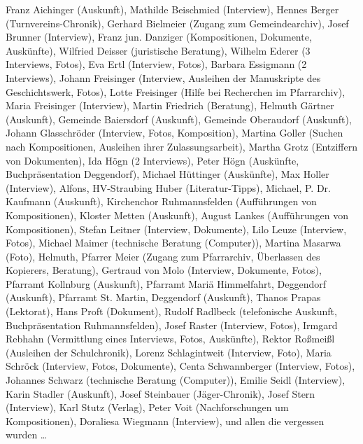 \documentclass{book}
\begin{document}
Franz Aichinger (Auskunft), Mathilde Beischmied (Interview), Hennes
Berger (Turnvereins-Chronik), Gerhard Bielmeier (Zugang zum
Gemeindearchiv), Josef Brunner (Interview), Franz jun. Danziger
(Kompositionen, Dokumente, Auskünfte), Wilfried Deisser (juristische
Beratung), Wilhelm Ederer (3 Inter\-views, Fotos), Eva Ertl (Interview,
Fotos), Barbara Essigmann (2 Interviews), Johann Freisinger (Interview,
Ausleihen der Manuskripte des Geschichtswerk, Fotos), Lotte Freisinger
(Hilfe bei Recherchen im Pfarrarchiv), Maria Frei\-singer (Interview),
Martin Friedrich (Beratung), Helmuth Gärtner (Auskunft), Gemeinde
Baiersdorf (Auskunft), Gemeinde Oberaudorf (Auskunft), Johann
Glasschröder (Interview, Fotos, Komposition), Martina Goller (Suchen
nach Kompositionen, Ausleihen ihrer Zulassungsarbeit), Martha Grotz
(Entziffern von Dokumenten), Ida Högn (2 Interviews), Peter Högn
(Auskünfte, Buchpräsentation Deggendorf), Michael Hüttinger
(Auskünfte), Max Holler (Interview), Alfons, HV-Straubing Huber
(Literatur-Tipps), Michael, P. Dr. Kaufmann (Auskunft), Kirchenchor
Ruh\-mannsfelden (Aufführungen von Kompositionen), Kloster Metten
(Aus\-kunft), August Lankes (Aufführungen von Kompositionen), Stefan
Leitner (Interview, Dokumente), Lilo Leuze (Interview, Fotos), Michael
Maimer (technische Beratung (Computer)), Martina Masarwa (Foto),
Helmuth, Pfarrer Meier (Zugang zum Pfarrarchiv, Überlassen des
Kopierers, Beratung), Gertraud von Molo (Interview, Dokumente, Fotos),
Pfarramt Kollnburg (Auskunft), Pfarramt Mariä Himmelfahrt, Deggendorf
(Auskunft), Pfarramt St. Martin, Deggendorf (Auskunft), Thanos Prapas
(Lektorat), Hans Proft (Dokument), Rudolf Radlbeck (telefonische
Auskunft, Buchpräsentation Ruhmannsfelden), Josef Raster (Interview,
Fotos), Irmgard Rebhahn (Vermittlung eines Interviews, Fotos,
Auskünfte), Rektor Roßmeißl (Ausleihen der Schulchronik), Lorenz
Schlagintweit (Inter\-view, Foto), Maria Schröck (Interview, Fotos,
Dokumente), Centa Schwann\-berger (Interview, Fotos), Johannes Schwarz
(technische Beratung (Com\-puter)), Emilie Seidl (Interview), Karin
Stadler (Auskunft), Josef Steinbauer (Jäger-Chronik), Josef Stern
(Interview), Karl Stutz (Verlag), Peter Voit (Nachforschungen um
Kompositionen), Doraliesa Wiegmann (Interview), und allen die vergessen
wurden …
\end{document}
